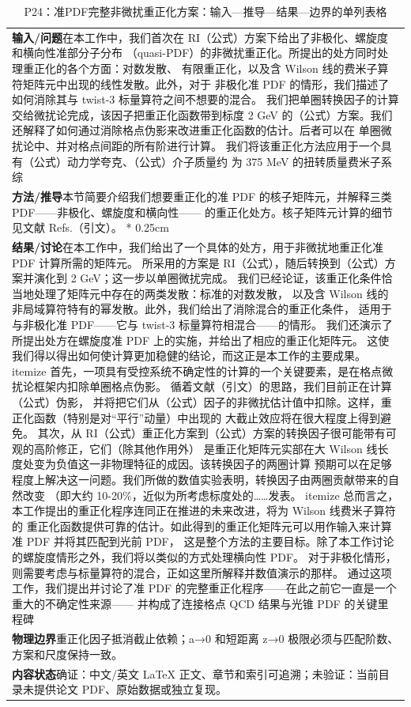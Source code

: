\documentclass[UTF8,11pt,oneside]{ctexbook}
\begin{document}
\begin{table}[htbp]
  \centering
  \caption*{P24：准PDF完整非微扰重正化方案：输入—推导—结果—边界的单列表格}
  \small
  \begin{tabular}{@{}p{}@{}}
    \toprule
    \textbf{输入/问题}\quad 在本工作中，我们首次在 RI（公式）方案下给出了非极化、螺旋度和横向性准部分子分布 （quasi-PDF）的非微扰重正化。所提出的处方同时处理重正化的各个方面：对数发散、 有限重正化，以及含 Wilson 线的费米子算符矩阵元中出现的线性发散。此外，对于 非极化准 PDF 的情形，我们描述了如何消除其与 twist-3 标量算符之间不想要的混合。 我们把单圈转换因子的计算交给微扰论完成，该因子把重正化函数带到标度 2 GeV 的（公式）方案。我们还解释了如何通过消除格点伪影来改进重正化函数的估计。后者可以在 单圈微扰论中、并对格点间距的所有阶进行计算。 我们将该重正化方法应用于一个具有（公式）动力学夸克、（公式）介子质量约 为 375 MeV 的扭转质量费米子系综 \\
    \textbf{方法/推导}\quad 本节简要介绍我们想要重正化的准 PDF 的核子矩阵元，并解释三类 PDF——非极化、螺旋度和横向性—— 的重正化处方。核子矩阵元计算的细节见文献 Refs.（引文）。 * 0.25cm \\
    \textbf{结果/讨论}\quad 在本工作中，我们给出了一个具体的处方，用于非微扰地重正化准 PDF 计算所需的矩阵元。 所采用的方案是 RI（公式），随后转换到（公式）方案并演化到 2 GeV；这一步以单圈微扰完成。 我们已经论证，该重正化条件恰当地处理了矩阵元中存在的两类发散：标准的对数发散， 以及含 Wilson 线的非局域算符特有的幂发散。此外，我们给出了消除混合的重正化条件， 适用于与非极化准 PDF——它与 twist-3 标量算符相混合——的情形。 我们还演示了所提出处方在螺旋度准 PDF 上的实施，并给出了相应的重正化矩阵元。 这使我们得以得出如何使计算更加稳健的结论，而这正是本工作的主要成果。 itemize 首先，一项具有受控系统不确定性的计算的一个关键要素，是在格点微扰论框架内扣除单圈格点伪影。 循着文献（引文）的思路，我们目前正在计算（公式）伪影， 并将把它们从（公式）因子的非微扰估计值中扣除。这样，重正化函数（特别是对``平行''动量）中出现的 大截止效应将在很大程度上得到避免。 其次，从 RI（公式）重正化方案到（公式）方案的转换因子很可能带有可观的高阶修正，它们（除其他作用外） 是重正化矩阵元实部在大 Wilson 线长度处变为负值这一非物理特征的成因。该转换因子的两圈计算 预期可以在足够程度上解决这一问题。我们所做的数值实验表明，转换因子由两圈贡献带来的自然改变 （即大约 10-20\%，近似为所考虑标度处的……发表。 itemize 总而言之，本工作提出的重正化程序连同正在推进的未来改进，将为 Wilson 线费米子算符的 重正化函数提供可靠的估计。如此得到的重正化矩阵元可以用作输入来计算准 PDF 并将其匹配到光前 PDF， 这是整个方法的主要目标。除了本工作讨论的螺旋度情形之外，我们将以类似的方式处理横向性 PDF。 对于非极化情形，则需要考虑与标量算符的混合，正如这里所解释并数值演示的那样。 通过这项工作，我们提出并讨论了准 PDF 的完整重正化程序——在此之前它一直是一个重大的不确定性来源—— 并构成了连接格点 QCD 结果与光锥 PDF 的关键里程碑 \\
    \textbf{物理边界}\quad 重正化因子抵消截止依赖；a→0 和短距离 z→0 极限必须与匹配阶数、方案和尺度保持一致。 \\
    \textbf{内容状态}\quad 确证：中文/英文 LaTeX 正文、章节和索引可追溯；未验证：当前目录未提供论文 PDF、原始数据或独立复现。 \\
    \bottomrule
  \end{tabular}
\end{table}
\end{document}
